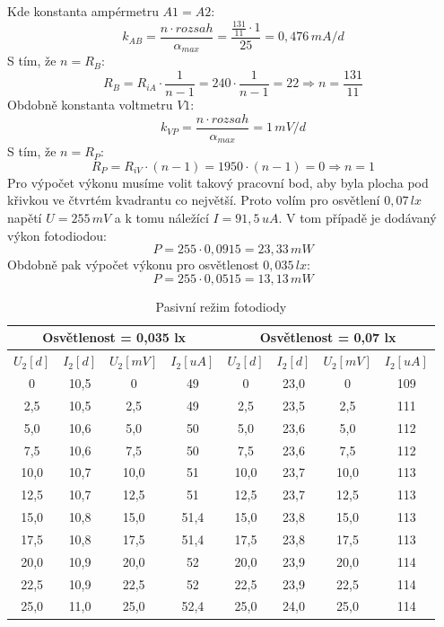 \documentclass[12pt]{article} %
\begin{document}
Kde konstanta ampérmetru $A1 = A2$:
\begin{equation}
k_{AB} = \frac{n\cdot rozsah}{\alpha_{max}} = \frac{\frac{131}{11}\cdot 1}{25} = 0,476 \, mA/d
\end{equation}
S tím, že $n = R_B$:
\begin{equation}
R_B = R_{iA}\cdot \frac{1}{n-1} = 240\cdot \frac{1}{n-1} = 22 \Rightarrow n = \frac{131}{11}
\end{equation}
Obdobně konstanta voltmetru $V1$:
\begin{equation}
k_{VP} = \frac{n\cdot rozsah}{\alpha_{max}} = 1 \, mV/d
\end{equation}
S tím, že $n = R_P$:
\begin{equation}
R_P = R_{iV}\cdot (n-1) = 1950\cdot (n-1) = 0 \Rightarrow n = 1
\end{equation}
Pro výpočet výkonu musíme volit takový pracovní bod, aby byla plocha pod křivkou ve čtvrtém kvadrantu co největší. Proto volím pro osvětlení $0,07\,lx$ napětí $U = 255\,mV$ a k tomu náležící $I = 91,5\,uA$.
V tom případě je dodávaný výkon fotodiodou:
\begin{equation}
P = 255 \cdot 0,0915 = 23,33\,mW
\end{equation}
Obdobně pak výpočet výkonu pro osvětlenost $0,035\,lx$:
\begin{equation}
P = 255 \cdot 0,0515 = 13,13\,mW
\end{equation}

\begin{table}[H]
\caption{Pasivní režim fotodiody}
\begin{tabular}{|c|c|c|c|c|c|c|c|}
\hline 
\multicolumn{4}{|c|}{Osvětlenost = 0,035 lx} & \multicolumn{4}{|c|}{Osvětlenost = 0,07 lx} \\ 
\hline 
$U_2 [d]$ & $I_2 [d]$ & $U_2 [mV]$ & $I_2 [uA]$ & $U_2 [d]$ & $I_2 [d]$ & $U_2 [mV]$ & $I_2 [uA]$ \\ 
\hline 
0 & 10,5 & 0 & 49 & 0 & 23,0 & 0 & 109 \\ 
\hline 
2,5 & 10,5 & 2,5 & 49 & 2,5 & 23,5 & 2,5 & 111 \\ 
\hline 
5,0 & 10,6 & 5,0 & 50 & 5,0 & 23,6 & 5,0 & 112 \\ 
\hline 
7,5 & 10,6 & 7,5 & 50 & 7,5 & 23,6 & 7,5 & 112 \\ 
\hline 
10,0 & 10,7 & 10,0 & 51 & 10,0 & 23,7 & 10,0 & 113 \\ 
\hline 
12,5 & 10,7 & 12,5 & 51 & 12,5 & 23,7 & 12,5 & 113 \\ 
\hline 
15,0 & 10,8 & 15,0 & 51,4 & 15,0 & 23,8 & 15,0 & 113 \\ 
\hline 
17,5 & 10,8 & 17,5 & 51,4 & 17,5 & 23,8 & 17,5 & 113 \\ 
\hline 
20,0 & 10,9 & 20,0 & 52 & 20,0 & 23,9 & 20,0 & 114 \\ 
\hline 
22,5 & 10,9 & 22,5 & 52 & 22,5 & 23,9 & 22,5 & 114 \\ 
\hline 
25,0 & 11,0 & 25,0 & 52,4 & 25,0 & 24,0 & 25,0 & 114 \\ 
\hline 
\end{tabular} 
\end{table}
\end{document}
